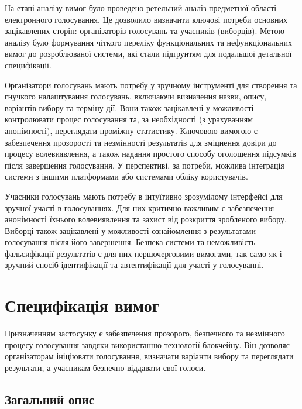 \documentclass[14pt]{extreport}
\begin{document}
  На етапі аналізу вимог було проведено ретельний аналіз предметної області електронного голосування. Це дозволило визначити ключові потреби ос\-новних зацікавлених сторін: організаторів голосувань та учасників (виборців). Метою аналізу було формування чіткого переліку функціональних та нефункціональних вимог до розроблюваної системи, які стали підґрунтям для подальшої детальної специфікації.
  
  Організатори голосувань мають потребу у зручному інструменті для створення та гнучкого налаштування голосувань, включаючи визначення назви, опису, варіантів вибору та терміну дії. Вони також зацікавлені у можливості контролювати процес голосування та, за необхідності (з урахуванням анонімності), переглядати проміжну статистику. Ключовою вимогою є забезпечення прозорості та незмінності результатів для зміцнення довіри до процесу волевиявлення, а також надання простого способу оголошення підсумків після завершення голосування. У перспективі, за потреби, можлива інтеграція системи з іншими платформами або системами обліку користувачів.
  
  Учасники голосувань мають потребу в інтуїтивно зрозумілому інтерфейсі для зручної участі в голосуваннях. Для них критично важливим є забезпечення анонімності їхнього волевиявлення та захист від розкриття зробленого вибору. Виборці також зацікавлені у можливості ознайомлення з результатами голосування після його завершення. Безпека системи та неможливість фальсифікації результатів є для них першочерговими вимогами, так само як і зручний спосіб ідентифікації та автентифікації для участі у голосуванні.
  
  \section{Специфікація вимог}
  
  Призначенням застосунку є забезпечення прозорого, безпечного та незмінного процесу голосування завдяки використанню технології блокчейну. Він дозволяє організаторам ініціювати голосування, визначати варіанти вибору та переглядати результати, а учасникам безпечно віддавати свої голоси.
  
  
  \subsection{Загальний опис}
\end{document}
